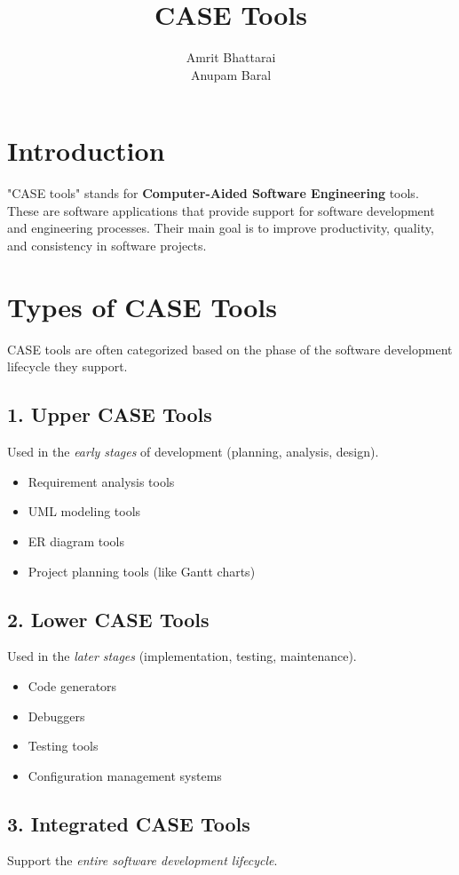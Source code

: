 \documentclass[aspectratio=169]{beamer}
\title{CASE Tools}
\author{Amrit Bhattarai\\
Anupam Baral
}
\begin{document}
\maketitle

\section*{Introduction}
"CASE tools" stands for \textbf{Computer-Aided Software Engineering} tools. These are software applications that provide support for software development and engineering processes. Their main goal is to improve productivity, quality, and consistency in software projects.

\section*{Types of CASE Tools}
CASE tools are often categorized based on the phase of the software development lifecycle they support.

\subsection*{1. Upper CASE Tools}
Used in the \textit{early stages} of development (planning, analysis, design).

\begin{itemize}
    \item Requirement analysis tools
    \item UML modeling tools
    \item ER diagram tools
    \item Project planning tools (like Gantt charts)
\end{itemize}

\subsection*{2. Lower CASE Tools}
Used in the \textit{later stages} (implementation, testing, maintenance).

\begin{itemize}
    \item Code generators
    \item Debuggers
    \item Testing tools
    \item Configuration management systems
\end{itemize}

\subsection*{3. Integrated CASE Tools}
Support the \textit{entire software development lifecycle}.
\end{document}
